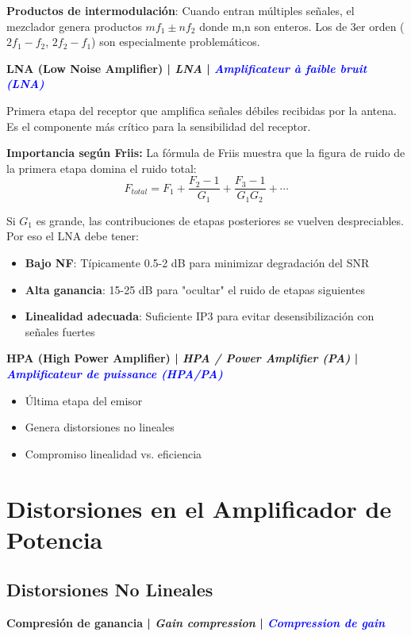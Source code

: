 \documentclass[a4paper,10pt]{article}
\begin{document}
\textbf{Productos de intermodulaci\'on}: Cuando entran m\'ultiples se\~nales, el mezclador genera productos $mf_1 \pm nf_2$ donde m,n son enteros. Los de 3er orden ($2f_1-f_2$, $2f_2-f_1$) son especialmente problem\'aticos.

\textbf{LNA (Low Noise Amplifier) | \textit{LNA} | \textcolor{blue}{\textit{Amplificateur \`a faible bruit (LNA)}}}

Primera etapa del receptor que amplifica se\~nales d\'ebiles recibidas por la antena. Es el componente m\'as cr\'itico para la sensibilidad del receptor.

\textbf{Importancia seg\'un Friis:} La f\'ormula de Friis muestra que la figura de ruido de la primera etapa domina el ruido total:
$$F_{total} = F_1 + \frac{F_2-1}{G_1} + \frac{F_3-1}{G_1G_2} + \cdots$$

Si $G_1$ es grande, las contribuciones de etapas posteriores se vuelven despreciables. Por eso el LNA debe tener:
\begin{itemize}[leftmargin=*]
    \item \textbf{Bajo NF}: T\'ipicamente 0.5-2 dB para minimizar degradaci\'on del SNR
    \item \textbf{Alta ganancia}: 15-25 dB para "ocultar" el ruido de etapas siguientes
    \item \textbf{Linealidad adecuada}: Suficiente IP3 para evitar desensibilizaci\'on con se\~nales fuertes
\end{itemize}

\textbf{HPA (High Power Amplifier) | \textit{HPA / Power Amplifier (PA)} | \textcolor{blue}{\textit{Amplificateur de puissance (HPA/PA)}}}
\begin{itemize}[leftmargin=*]
    \item Última etapa del emisor
    \item Genera distorsiones no lineales
    \item Compromiso linealidad vs. eficiencia
\end{itemize}

\section{Distorsiones en el Amplificador de Potencia}

\subsection{Distorsiones No Lineales}

\textbf{Compresi\'on de ganancia | \textit{Gain compression} | \textcolor{blue}{\textit{Compression de gain}}}
\end{document}
